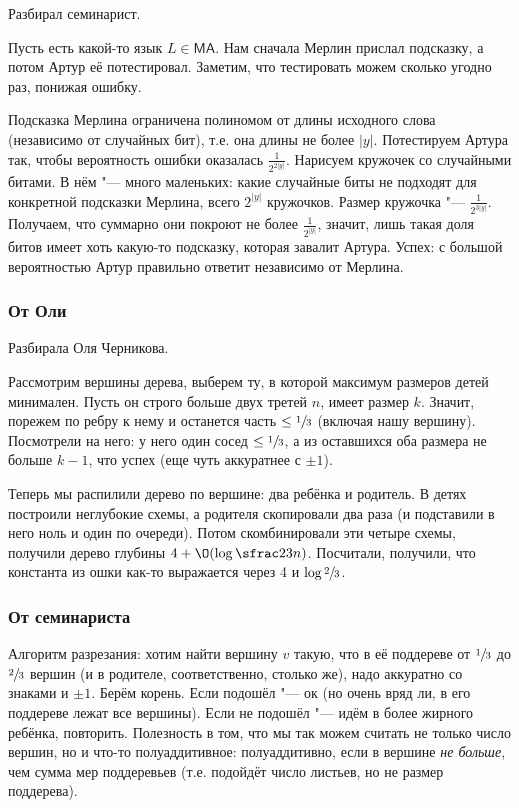 	Разбирал семинарист.

	Пусть есть какой-то язык $L \in \mathsf{MA}$.
	Нам сначала Мерлин прислал подсказку, а потом Артур её потестировал.
	Заметим, что тестировать можем сколько угодно раз, понижая ошибку.

	Подсказка Мерлина ограничена полиномом от длины исходного слова (независимо от случайных бит),
	т.е. она длины не более $|y|$.
	Потестируем Артура так, чтобы вероятность ошибки оказалась $\frac{1}{2^{2|y|}}$.
	Нарисуем кружочек со случайными битами.
	В нём "--- много маленьких: какие случайные биты не подходят для конкретной подсказки Мерлина,
	всего $2^{|y|}$ кружочков.
	Размер кружочка "--- $\frac{1}{2^{3|y|}}$.
	Получаем, что суммарно они покроют не более $\frac{1}{2^{|y|}}$, значит, лишь такая
	доля битов имеет хоть какую-то подсказку, которая завалит Артура.
	Успех: с большой вероятностью Артур правильно ответит независимо от Мерлина.

	\subsubsection{От Оли}
		Разбирала Оля Черникова.

		Рассмотрим вершины дерева, выберем ту, в которой максимум размеров детей минимален.
		Пусть он строго больше двух третей $n$, имеет размер $k$.
		Значит, порежем по ребру к нему и останется часть $\le \sfrac 1 3$ (включая нашу вершину).
		Посмотрели на него: у него один сосед $\le \sfrac 13$, а из оставшихся
		оба размера не больше $k-1$, что успех (еще чуть аккуратнее с $\pm 1$).

		Теперь мы распилили дерево по вершине: два ребёнка и родитель.
		В детях построили неглубокие схемы, а родителя скопировали два раза (и подставили в него ноль и один по очереди).
		Потом скомбинировали эти четыре схемы, получили дерево глубины $4 + \O(\log \sfrac23 n)$.
		Посчитали, получили, что константа из ошки как-то выражается через 4 и $\log \sfrac 23$.

	\subsubsection{От семинариста}
		Алгоритм разрезания: хотим найти вершину $v$ такую, что в её поддереве от $\sfrac 1 3$ до $\sfrac 23$
		вершин (и в родителе, соответственно, столько же), надо аккуратно со знаками и $\pm 1$.
		Берём корень.
		Если подошёл "--- ок (но очень вряд ли, в его поддереве лежат все вершины).
		Если не подошёл "--- идём в более жирного ребёнка, повторить.
		Полезность в том, что мы так можем считать не только число вершин, но и что-то
		полуаддитивное: полуаддитивно, если в вершине \textit{не больше}, чем сумма мер поддеревьев
		(т.е. подойдёт число листьев, но не размер поддерева).
